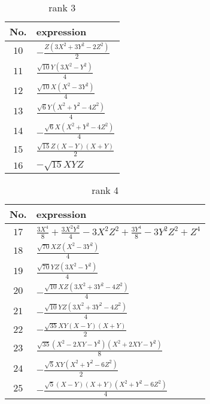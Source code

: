 \documentclass[fleqn,8pt,landscape]{jsarticle}
\begin{document}
\begin{table}[ht!]
\begin{center}
\caption{rank 3}
\renewcommand{\arraystretch}{1.3}
\begin{tabular}{cl} \hline \hline
No. & expression \\ \hline
$ 10 $ & $ - \frac{Z \left(3 X^{2} + 3 Y^{2} - 2 Z^{2}\right)}{2} $ \\
$ 11 $ & $ \frac{\sqrt{10} Y \left(3 X^{2} - Y^{2}\right)}{4} $ \\
$ 12 $ & $ \frac{\sqrt{10} X \left(X^{2} - 3 Y^{2}\right)}{4} $ \\
$ 13 $ & $ \frac{\sqrt{6} Y \left(X^{2} + Y^{2} - 4 Z^{2}\right)}{4} $ \\
$ 14 $ & $ - \frac{\sqrt{6} X \left(X^{2} + Y^{2} - 4 Z^{2}\right)}{4} $ \\
$ 15 $ & $ \frac{\sqrt{15} Z \left(X - Y\right) \left(X + Y\right)}{2} $ \\
$ 16 $ & $ - \sqrt{15} X Y Z $ \\
 \hline \hline
\end{tabular}
\end{center}
\end{table}
\begin{table}[ht!]
\begin{center}
\caption{rank 4}
\renewcommand{\arraystretch}{1.3}
\begin{tabular}{cl} \hline \hline
No. & expression \\ \hline
$ 17 $ & $ \frac{3 X^{4}}{8} + \frac{3 X^{2} Y^{2}}{4} - 3 X^{2} Z^{2} + \frac{3 Y^{4}}{8} - 3 Y^{2} Z^{2} + Z^{4} $ \\
$ 18 $ & $ \frac{\sqrt{70} X Z \left(X^{2} - 3 Y^{2}\right)}{4} $ \\
$ 19 $ & $ \frac{\sqrt{70} Y Z \left(3 X^{2} - Y^{2}\right)}{4} $ \\
$ 20 $ & $ - \frac{\sqrt{10} X Z \left(3 X^{2} + 3 Y^{2} - 4 Z^{2}\right)}{4} $ \\
$ 21 $ & $ - \frac{\sqrt{10} Y Z \left(3 X^{2} + 3 Y^{2} - 4 Z^{2}\right)}{4} $ \\
$ 22 $ & $ - \frac{\sqrt{35} X Y \left(X - Y\right) \left(X + Y\right)}{2} $ \\
$ 23 $ & $ \frac{\sqrt{35} \left(X^{2} - 2 X Y - Y^{2}\right) \left(X^{2} + 2 X Y - Y^{2}\right)}{8} $ \\
$ 24 $ & $ - \frac{\sqrt{5} X Y \left(X^{2} + Y^{2} - 6 Z^{2}\right)}{2} $ \\
$ 25 $ & $ - \frac{\sqrt{5} \left(X - Y\right) \left(X + Y\right) \left(X^{2} + Y^{2} - 6 Z^{2}\right)}{4} $ \\
 \hline \hline
\end{tabular}
\end{center}
\end{table}
\end{document}
